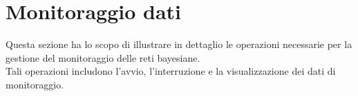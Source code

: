\section{Monitoraggio dati}\label{Monitoraggio}
Questa sezione ha lo scopo di illustrare in dettaglio le operazioni necessarie per la gestione del monitoraggio delle reti bayesiane.\\
Tali operazioni includono l'avvio, l'interruzione e la visualizzazione dei dati di monitoraggio.



\pagebreak



\pagebreak



\pagebreak



\pagebreak



\pagebreak


